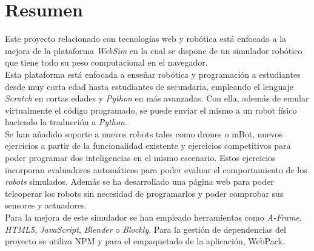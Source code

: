 \chapter*{Resumen}

     Este proyecto relacionado con tecnologías web y robótica está enfocado a la mejora de la plataforma \emph{WebSim} en la cual se dispone de un simulador robótico que tiene todo su peso computacional en el navegador. \\
       
    Esta plataforma está enfocada a enseñar robótica y programación a estudiantes desde muy corta edad hasta estudiantes de secundaria, empleando el lenguaje \emph{Scratch} en cortas edades y \emph{Python} en más avanzadas. Con ella, además de emular virtualmente el código programado, se puede enviar el mismo a un robot físico haciendo la traducción a \emph{Python}. \\
    
    
    Se han añadido soporte a nuevos robots tales como drones o mBot, nuevos ejercicios a partir de la funcionalidad existente y ejercicios competitivos para poder programar dos inteligencias en el mismo escenario. Estos ejercicios incorporan evaluadores automáticos para poder evaluar el comportamiento de los \textit{robots} simulados. Además se ha desarrollado una página web para poder teleoperar los robots sin necesidad de programarlos y poder comprobar sus sensores y actuadores. \\
    
    
    Para la mejora de este simulador se han empleado herramientas como \textit{A-Frame}, \textit{HTML5}, \textit{JavaScript}, \textit{Blender} o \textit{Blockly}. Para la gestión de dependencias del proyecto se utiliza NPM y para el empaquetado de la aplicación, WebPack.
